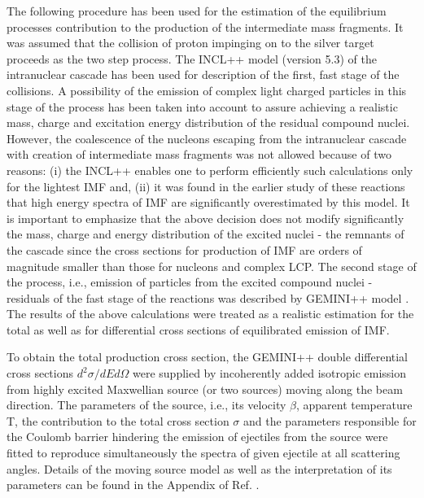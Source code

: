 The following procedure has been used for the estimation of the
equilibrium processes contribution to the production of the
intermediate mass fragments. It was assumed that the collision of
proton impinging on to the silver target proceeds as the two step
process. The INCL++ model (version 5.3) \cite{Mancusi14A} of the
intranuclear cascade has been used for description of the first,
fast stage of the collisions.
%
%
%
A possibility of the emission of complex light charged particles in
this stage of the process has been taken into account to assure
achieving a realistic mass, charge and excitation energy
distribution of the residual compound nuclei. However, the
coalescence of the nucleons escaping from the intranuclear cascade
with creation of intermediate mass fragments was not allowed because
of two reasons: (i) the INCL++ enables one to perform efficiently
such calculations only for the lightest IMF \cite{Boudard13A} and,
(ii) it was found in the earlier study of these reactions
\cite{Sharma16A} that high energy spectra of IMF are significantly
overestimated by this model.  It is important to emphasize that the
above decision does not modify significantly the mass, charge and
energy distribution of the excited nuclei - the remnants of the
cascade since the cross sections for production of IMF are orders of
magnitude smaller than those for nucleons and complex LCP. The
second stage of the process, i.e., emission of particles from the
excited compound nuclei - residuals of the fast stage of the
reactions was described by GEMINI++ model \cite{GEMINI++}.  The
results of the above calculations were treated as a realistic
estimation for the total as well as for differential cross sections
of equilibrated emission of IMF.

To obtain the total production cross section, the GEMINI++ double
differential cross sections $d^2\sigma/dEd\Omega$ were supplied by
incoherently added isotropic emission from highly excited Maxwellian
source (or two sources) moving along the beam direction. The
parameters of the source, i.e., its velocity $\beta$, apparent
temperature T, the contribution to the total cross section $\sigma$
and the parameters responsible for the Coulomb barrier hindering the
emission of ejectiles from the source were fitted to reproduce
simultaneously the spectra of given ejectile at all scattering
angles. Details of the moving source model as well as the
interpretation of its parameters  can be found in the Appendix of
Ref. \cite{Bubak07A}.

